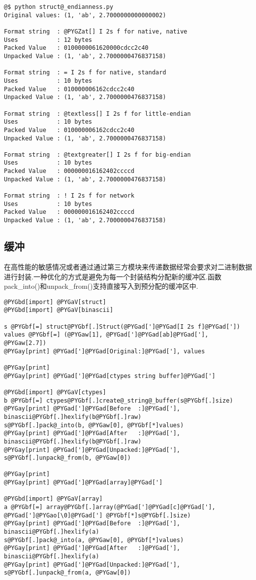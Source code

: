 \documentclass[letterpaper,10pt,english]{manual}
\begin{document}
\begin{Verbatim}[commandchars=@\[\]]
@$ python struct@_endianness.py
Original values: (1, 'ab', 2.7000000000000002)

Format string  : @PYGZat[] I 2s f for native, native
Uses           : 12 bytes
Packed Value   : 0100000061620000cdcc2c40
Unpacked Value : (1, 'ab', 2.7000000476837158)

Format string  : = I 2s f for native, standard
Uses           : 10 bytes
Packed Value   : 010000006162cdcc2c40
Unpacked Value : (1, 'ab', 2.7000000476837158)

Format string  : @textless[] I 2s f for little-endian
Uses           : 10 bytes
Packed Value   : 010000006162cdcc2c40
Unpacked Value : (1, 'ab', 2.7000000476837158)

Format string  : @textgreater[] I 2s f for big-endian
Uses           : 10 bytes
Packed Value   : 000000016162402ccccd
Unpacked Value : (1, 'ab', 2.7000000476837158)

Format string  : ! I 2s f for network
Uses           : 10 bytes
Packed Value   : 000000016162402ccccd
Unpacked Value : (1, 'ab', 2.7000000476837158)
\end{Verbatim}


\subsection{缓冲}

在高性能的敏感情况或者通过通过第三方模块来传递数据经常会要求对二进制数据进行封装.一种优化的方式是避免为每一个封装结构分配新的缓冲区.函数pack\_into()和unpack\_from()支持直接写入到预分配的缓冲区中.

\begin{Verbatim}[commandchars=@\[\]]
@PYGbd[import] @PYGaV[struct]
@PYGbd[import] @PYGaV[binascii]

s @PYGbf[=] struct@PYGbf[.]Struct(@PYGad[']@PYGad[I 2s f]@PYGad['])
values @PYGbf[=] (@PYGaw[1], @PYGad[']@PYGad[ab]@PYGad['], @PYGaw[2.7])
@PYGay[print] @PYGad[']@PYGad[Original:]@PYGad['], values

@PYGay[print]
@PYGay[print] @PYGad[']@PYGad[ctypes string buffer]@PYGad[']

@PYGbd[import] @PYGaV[ctypes]
b @PYGbf[=] ctypes@PYGbf[.]create@_string@_buffer(s@PYGbf[.]size)
@PYGay[print] @PYGad[']@PYGad[Before  :]@PYGad['], binascii@PYGbf[.]hexlify(b@PYGbf[.]raw)
s@PYGbf[.]pack@_into(b, @PYGaw[0], @PYGbf[*]values)
@PYGay[print] @PYGad[']@PYGad[After   :]@PYGad['], binascii@PYGbf[.]hexlify(b@PYGbf[.]raw)
@PYGay[print] @PYGad[']@PYGad[Unpacked:]@PYGad['], s@PYGbf[.]unpack@_from(b, @PYGaw[0])

@PYGay[print]
@PYGay[print] @PYGad[']@PYGad[array]@PYGad[']

@PYGbd[import] @PYGaV[array]
a @PYGbf[=] array@PYGbf[.]array(@PYGad[']@PYGad[c]@PYGad['], @PYGad[']@PYGao[\0]@PYGad['] @PYGbf[*]s@PYGbf[.]size)
@PYGay[print] @PYGad[']@PYGad[Before  :]@PYGad['], binascii@PYGbf[.]hexlify(a)
s@PYGbf[.]pack@_into(a, @PYGaw[0], @PYGbf[*]values)
@PYGay[print] @PYGad[']@PYGad[After   :]@PYGad['], binascii@PYGbf[.]hexlify(a)
@PYGay[print] @PYGad[']@PYGad[Unpacked:]@PYGad['], s@PYGbf[.]unpack@_from(a, @PYGaw[0])
\end{Verbatim}
\end{document}
